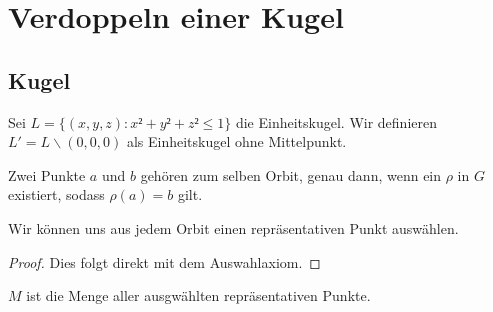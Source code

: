 \chapter{Verdoppeln einer Kugel}

\section{Kugel}
\begin{definition}\label{def:kugel_ohne_mittelpunkt}
Sei $L=\{(x,y,z):x²+y²+z²\leq1\}$ die Einheitskugel. Wir definieren $L'=L\backslash {(0,0,0)}$ als Einheitskugel ohne Mittelpunkt.
\leanok
\end{definition}

\begin{definition}[Orbit] \label{def:orbit} 
Zwei Punkte $a$ und $b$ gehören zum selben Orbit, genau dann, wenn ein $\rho$ in $G$ existiert, sodass $\rho(a)=b$ gilt.
\leanok {}
\end{definition}



\begin{lemma} \label{theorem:rep_punkte}
Wir können uns aus jedem Orbit einen repräsentativen Punkt auswählen.
 \leanok
\end{lemma}
\begin{proof}  \leanok
Dies folgt direkt mit dem Auswahlaxiom.
\end{proof}

\begin{definition} \label{def:menge_rep_punkte} 
$M$ ist die Menge aller ausgwählten repräsentativen Punkte.
\end{definition} 

